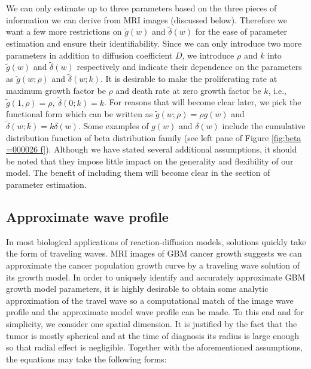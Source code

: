 \documentclass{aims}
\numberwithin{equation}{section}
\begin{document}
We can only estimate up to three parameters based on the three pieces of information
we can derive from MRI images (discussed below). Therefore we want a few more restrictions
on $\tilde{g}(w)$ and $\tilde{\delta}(w)$ for the ease of parameter
estimation and ensure their identifiability. Since we can only introduce
two more parameters in addition to diffusion coefficient $D$, we
introduce $\rho$ and $k$ into $\tilde{g}(w)$ and $\tilde{\delta}(w)$
respectively and indicate their dependence on the parameters as $\tilde{g}(w;\rho)$
and $\tilde{\delta}(w;k)$. It is desirable to make the proliferating
rate at maximum growth factor be $\rho$
and death rate at zero growth factor
be $k$, i.e., $\tilde{g}(1,\rho)=\rho,\ \tilde{\delta}(0;k)=k$.
For reasons that will become clear later, we pick the functional form
which can be written as $\tilde{g}(w;\rho)=\rho g(w)$ and $\tilde{\delta}(w;k)=k\delta(w)$. Some examples of $g(w)$ and $\delta(w)$ include the cumulative distribution function of beta distribution family (see left pane of Figure \ref{fig:beta =000026 f}).
Although we have stated several additional assumptions, it should
be noted that they impose little impact on the generality and flexibility
of our model. The benefit of including them will become clear in the
section of parameter estimation.


\subsection{Approximate wave profile}

In most biological applications of reaction-diffusion models, solutions quickly take the form of traveling waves. MRI images of GBM cancer growth suggests we can approximate the cancer population growth curve by a traveling wave solution of its growth model.
In order to uniquely identify and accurately approximate GBM growth model parameters,
it is highly desirable to obtain some analytic approximation of the travel wave so a
computational match of the image wave profile and the approximate model wave profile can be made.
To this end and for simplicity, we consider one spatial dimension. It is justified
by the fact that the tumor is mostly spherical and at the time of
diagnosis its radius is large enough so that radial effect is negligible.
Together with the aforementioned assumptions, the equations may take the following forms:
\end{document}
